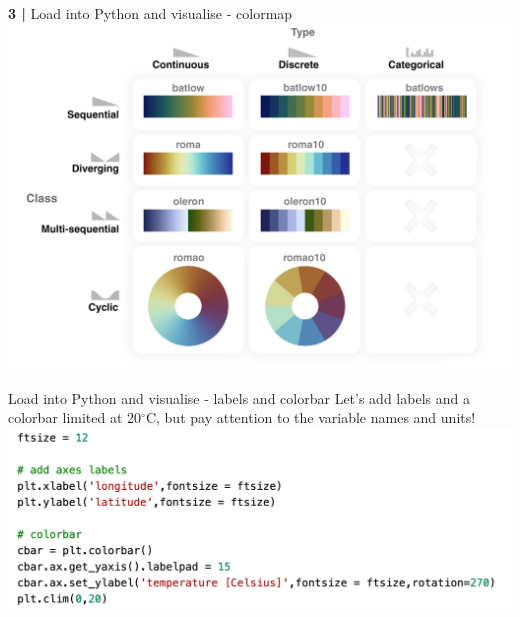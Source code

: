 \begin{frame}{\textbf{3 |} Load into Python and visualise - colormap} 
    \vspace{0.5cm}
    \includegraphics[scale=0.20]{images/Colormap_3.png}
\end{frame}
  
  
 
\begin{frame}{\insertsectionnumber{ |} Load into Python and visualise - labels and colorbar} 
    Let's add labels and a colorbar limited at 20$^{\circ}$C, but pay attention to the variable names and units!
        \vspace{0.5cm}
    \includegraphics[scale=0.35]{images/Script1_step6.png}
\end{frame}
 
